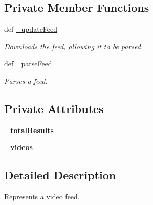 \subsection*{\-Private \-Member \-Functions}
\begin{DoxyCompactItemize}
\item 
def \hyperlink{class_sbs_on_demand_1_1_feed_1_1_feed_a4190b5e6e62f29d1f62e4c730ea4d2ee}{\-\_\-update\-Feed}
\begin{DoxyCompactList}\small\item\em \-Downloads the feed, allowing it to be parsed. \end{DoxyCompactList}\item 
def \hyperlink{class_sbs_on_demand_1_1_feed_1_1_feed_a87c3e14eaefb110dba7ecd7ffc53d524}{\-\_\-parse\-Feed}
\begin{DoxyCompactList}\small\item\em \-Parses a feed. \end{DoxyCompactList}\end{DoxyCompactItemize}
\subsection*{\-Private \-Attributes}
\begin{DoxyCompactItemize}
\item 
\hypertarget{class_sbs_on_demand_1_1_feed_1_1_feed_a23848f00215d1e93165ca302c1074d1b}{
{\bfseries \-\_\-total\-Results}}
\label{class_sbs_on_demand_1_1_feed_1_1_feed_a23848f00215d1e93165ca302c1074d1b}

\item 
\hypertarget{class_sbs_on_demand_1_1_feed_1_1_feed_ace4896a62f8d48476dc1fa5503ccda05}{
{\bfseries \-\_\-videos}}
\label{class_sbs_on_demand_1_1_feed_1_1_feed_ace4896a62f8d48476dc1fa5503ccda05}

\end{DoxyCompactItemize}


\subsection{\-Detailed \-Description}
\-Represents a video feed. 

